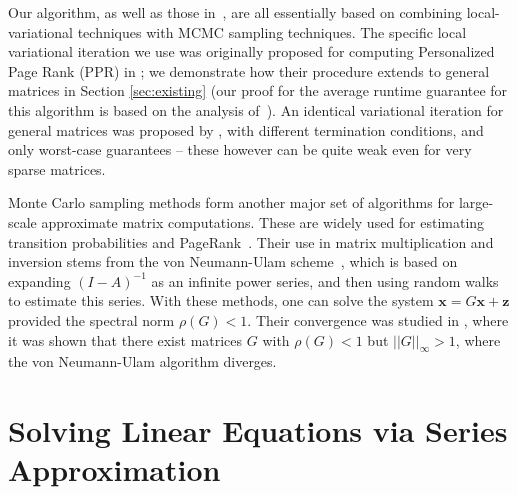 Our algorithm, as well as those in~\cite{Lofgren2014,lofgren2016personalized,banerjee2015fast}, are all essentially based on combining local-variational techniques with MCMC sampling techniques.
The specific local variational iteration we use was originally proposed for computing Personalized Page Rank (PPR) in \cite{andersen2007local}; we demonstrate how their procedure extends to general matrices in Section \ref{sec:existing} (our proof for the average runtime guarantee for this algorithm is based on the analysis of~\cite{Lofgren2013}). 
An identical variational iteration for general matrices was proposed by \cite{lee2014asynchronous}, with different termination conditions, and only worst-case guarantees -- these however can be quite weak even for very sparse matrices. 


Monte Carlo sampling methods form another major set of algorithms for large-scale approximate matrix computations. 
These are widely used for estimating transition probabilities and PageRank~\cite{Avrachenkov2007}.
Their use in matrix multiplication and inversion stems from the von Neumann-Ulam scheme~\cite{forsythe1950matrix}, which is based on expanding $(I-A)^{-1}$ as an infinite power series, and then using random walks to estimate this series. 
With these methods, one can solve the system $\mathbf{x} = G\mathbf{x} + \mathbf{z}$ provided the spectral norm $\rho(G) < 1$. 
Their convergence was studied in \cite{ji2013convergence}, where it was shown that there exist matrices $G$ with $\rho(G) < 1$ but  $||G||_\infty > 1$, where the von Neumann-Ulam algorithm diverges.  




\section{Solving Linear Equations via Series Approximation}
\label{sec:linsolve}


